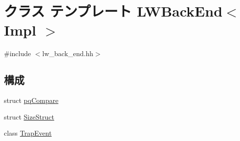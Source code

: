 \hypertarget{classLWBackEnd}{
\section{クラス テンプレート LWBackEnd$<$ Impl $>$}
\label{classLWBackEnd}
}


{\ttfamily \#include $<$lw\_\-back\_\-end.hh$>$}\subsection*{構成}
\begin{DoxyCompactItemize}
\item 
struct \hyperlink{structLWBackEnd_1_1pqCompare}{pqCompare}
\item 
struct \hyperlink{structLWBackEnd_1_1SizeStruct}{SizeStruct}
\item 
class \hyperlink{classLWBackEnd_1_1TrapEvent}{TrapEvent}
\end{DoxyCompactItemize}
